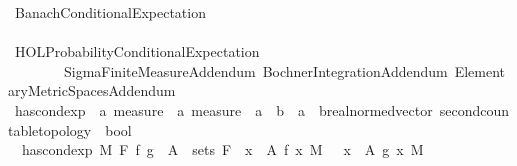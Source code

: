 %
\begin{isabellebody}%
%
%
\isadelimtheory
%
\endisadelimtheory
%
\isatagtheory
{}\isamarkupfalse%
\ Banach{\isacharunderscore}{\kern0pt}Conditional{\isacharunderscore}{\kern0pt}Expectation\ \ \ \ \ \ \ \ \ \ \ \ \ \ \ \ \ \ \ \ \ \ \ \ \ \ \ \ \ \ \ \ \ \ \ \ \ \ \ \ \ \ \ \ \ \ \ \ \ \ \ \ \ \ \ \ \ \ \ \ \ \ \ \ \ \ \ \ \ \ \ \ \ \ \ \ \ \ \ \ \ \ \isanewline
{}\ {\isachardoublequoteopen}HOL{\isacharminus}{\kern0pt}Probability{\isachardot}{\kern0pt}Conditional{\isacharunderscore}{\kern0pt}Expectation{\isachardoublequoteclose}\isanewline
\ \ \ \ \ \ \ \ Sigma{\isacharunderscore}{\kern0pt}Finite{\isacharunderscore}{\kern0pt}Measure{\isacharunderscore}{\kern0pt}Addendum\ Bochner{\isacharunderscore}{\kern0pt}Integration{\isacharunderscore}{\kern0pt}Addendum\ Elementary{\isacharunderscore}{\kern0pt}Metric{\isacharunderscore}{\kern0pt}Spaces{\isacharunderscore}{\kern0pt}Addendum\isanewline
{}%
\endisatagtheory
{\isafoldtheory}%
%
\isadelimtheory
\ \ \ \ \ \ \ \ \ \ \ \ \ \ \ \ \ \ \ \ \ \ \ \ \ \ \ \ \ \ \ \ \ \ \ \ \ \ \ \ \ \ \ \isanewline
%
\endisadelimtheory
\isanewline
{}\isamarkupfalse%
\ has{\isacharunderscore}{\kern0pt}cond{\isacharunderscore}{\kern0pt}exp\ {\isacharcolon}{\kern0pt}{\isacharcolon}{\kern0pt}\ {\isachardoublequoteopen}{\isacharprime}{\kern0pt}a\ measure\ {\isasymRightarrow}\ {\isacharprime}{\kern0pt}a\ measure\ {\isasymRightarrow}\ {\isacharparenleft}{\kern0pt}{\isacharprime}{\kern0pt}a\ {\isasymRightarrow}\ {\isacharprime}{\kern0pt}b{\isacharparenright}{\kern0pt}\ {\isasymRightarrow}\ {\isacharparenleft}{\kern0pt}{\isacharprime}{\kern0pt}a\ {\isasymRightarrow}\ {\isacharprime}{\kern0pt}b{\isacharcolon}{\kern0pt}{\isacharcolon}{\kern0pt}{\isacharbraceleft}{\kern0pt}real{\isacharunderscore}{\kern0pt}normed{\isacharunderscore}{\kern0pt}vector{\isacharcomma}{\kern0pt}\ second{\isacharunderscore}{\kern0pt}countable{\isacharunderscore}{\kern0pt}topology{\isacharbraceright}{\kern0pt}{\isacharparenright}{\kern0pt}\ {\isasymRightarrow}\ bool{\isachardoublequoteclose}\ \ \isanewline
\ \ {\isachardoublequoteopen}has{\isacharunderscore}{\kern0pt}cond{\isacharunderscore}{\kern0pt}exp\ M\ F\ f\ g\ {\isacharequal}{\kern0pt}\ {\isacharparenleft}{\kern0pt}{\isacharparenleft}{\kern0pt}{\isasymforall}A\ {\isasymin}\ sets\ F{\isachardot}{\kern0pt}\ {\isacharparenleft}{\kern0pt}{\isasymintegral}\ x\ {\isasymin}\ A{\isachardot}{\kern0pt}\ f\ x\ {\isasympartial}M{\isacharparenright}{\kern0pt}\ {\isacharequal}{\kern0pt}\ {\isacharparenleft}{\kern0pt}{\isasymintegral}\ x\ {\isasymin}\ A{\isachardot}{\kern0pt}\ g\ x\ {\isasympartial}M{\isacharparenright}{\kern0pt}{\isacharparenright}{\kern0pt}\isanewline

\end{isabellebody}
